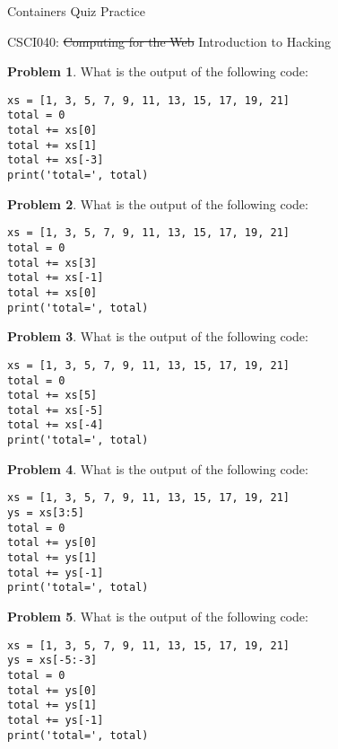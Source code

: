 \documentclass[10pt]{article}
\theoremstyle{definition}
\newtheorem{problem}{Problem}
\begin{document}
\begin{center}
    {
\Large
Containers Quiz Practice
}

    \vspace{0.1in}
    CSCI040: \sout{Computing for the Web} Introduction to Hacking

    \vspace{0.1in}
\end{center}


\vspace{0.15in}

\begin{problem}
    What is the output of the following code:
\end{problem}
\begin{lstlisting}
xs = [1, 3, 5, 7, 9, 11, 13, 15, 17, 19, 21]
total = 0
total += xs[0]
total += xs[1]
total += xs[-3]
print('total=', total)
\end{lstlisting}
\vspace{0.15in}

\begin{problem}
    What is the output of the following code:
\end{problem}
\begin{lstlisting}
xs = [1, 3, 5, 7, 9, 11, 13, 15, 17, 19, 21]
total = 0
total += xs[3]
total += xs[-1]
total += xs[0]
print('total=', total)
\end{lstlisting}
\vspace{0.15in}

\begin{problem}
    What is the output of the following code:
\end{problem}
\begin{lstlisting}
xs = [1, 3, 5, 7, 9, 11, 13, 15, 17, 19, 21]
total = 0
total += xs[5]
total += xs[-5]
total += xs[-4]
print('total=', total)
\end{lstlisting}
\vspace{0.15in}

\begin{problem}
    What is the output of the following code:
\end{problem}
\begin{lstlisting}
xs = [1, 3, 5, 7, 9, 11, 13, 15, 17, 19, 21]
ys = xs[3:5]
total = 0
total += ys[0]
total += ys[1]
total += ys[-1]
print('total=', total)
\end{lstlisting}
\vspace{0.15in}

\begin{problem}
    What is the output of the following code:
\end{problem}
\begin{lstlisting}
xs = [1, 3, 5, 7, 9, 11, 13, 15, 17, 19, 21]
ys = xs[-5:-3]
total = 0
total += ys[0]
total += ys[1]
total += ys[-1]
print('total=', total)
\end{lstlisting}
\vspace{0.15in}
\end{document}
